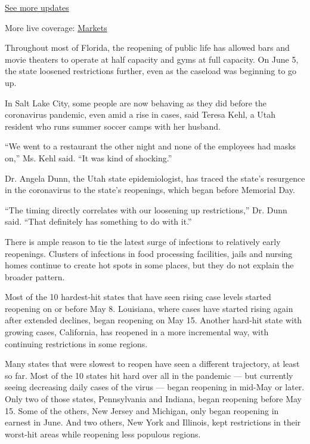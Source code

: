 \href{https://www.nytimes.com/2020/08/01/world/coronavirus-covid-19.html?action=click\&pgtype=Article\&state=default\&region=MAIN_CONTENT_1\&context=storylines_live_updates}{See
more updates}

More live coverage:
\href{https://www.nytimes.com/live/2020/07/31/business/stock-market-today-coronavirus?action=click\&pgtype=Article\&state=default\&region=MAIN_CONTENT_1\&context=storylines_live_updates}{Markets}

Throughout most of Florida, the reopening of public life has allowed
bars and movie theaters to operate at half capacity and gyms at full
capacity. On June 5, the state loosened restrictions further, even as
the caseload was beginning to go up.

In Salt Lake City, some people are now behaving as they did before the
coronavirus pandemic, even amid a rise in cases, said Teresa Kehl, a
Utah resident who runs summer soccer camps with her husband.

``We went to a restaurant the other night and none of the employees had
masks on,'' Ms. Kehl said. ``It was kind of shocking.''

Dr. Angela Dunn, the Utah state epidemiologist, has traced the state's
resurgence in the coronavirus to the state's reopenings, which began
before Memorial Day.

``The timing directly correlates with our loosening up restrictions,''
Dr. Dunn said. ``That definitely has something to do with it.''

There is ample reason to tie the latest surge of infections to
relatively early reopenings. Clusters of infections in food processing
facilities, jails and nursing homes continue to create hot spots in some
places, but they do not explain the broader pattern.

Most of the 10 hardest-hit states that have seen rising case levels
started reopening on or before May 8. Louisiana, where cases have
started rising again after extended declines, began reopening on May 15.
Another hard-hit state with growing cases, California, has reopened in a
more incremental way, with continuing restrictions in some regions.

Many states that were slowest to reopen have seen a different
trajectory, at least so far. Most of the 10 states hit hard over all in
the pandemic --- but currently seeing decreasing daily cases of the
virus --- began reopening in mid-May or later. Only two of those states,
Pennsylvania and Indiana, began reopening before May 15. Some of the
others, New Jersey and Michigan, only began reopening in earnest in
June. And two others, New York and Illinois, kept restrictions in their
worst-hit areas while reopening less populous regions.

